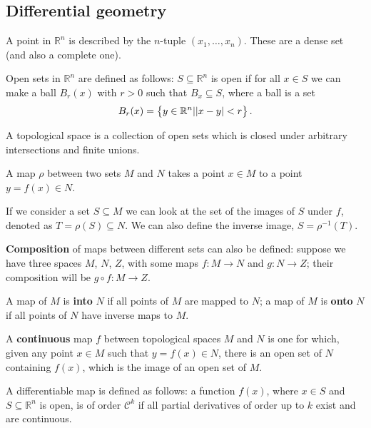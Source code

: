 \documentclass[main.tex]{subfiles}
\begin{document}
\subsection{Differential geometry}


A point in \(\mathbb{R}^{n}\) is described by the \(n\)-tuple \((x_1, \dots, x_n)\). 
These are a dense set (and also a complete one).

Open sets in \(\mathbb{R}^{n}\) are defined as follows: \(S \subseteq \mathbb{R}^{n}\) is open if for all \(x \in S\) we can make a ball \(B_r(x)\) with \(r > 0\) such that \(B_x \subseteq S\), where a ball is a set 
%
\begin{align}
B_r (x) = \qty{y \in \mathbb{R}^{n} | \abs{x - y} < r}
\,.
\end{align}

A topological space is a collection of open sets which is closed under arbitrary intersections and finite unions. 

A map \(\rho \) between two sets \(M\) and \(N\) takes a point \(x \in M\) to a point \(y = f(x) \in N\). 

If we consider a set \(S \subseteq M\) we can look at the set of the images of \(S\) under \(f\), denoted as \(T = \rho (S) \subseteq N\). 
We can also define the inverse image, \(S = \rho^{-1} (T)\).

\textbf{Composition} of maps between different sets can also be defined: suppose we have three spaces \(M\), \(N\), \(Z\), with some maps \(f \colon M \to N\) and \(g \colon N \to Z\); their composition will be \(g \circ f \colon M \to Z\). 

A map of \(M\) is \textbf{into} \(N\) if all points of \(M\) are mapped to \(N\); a map of \(M\) is \textbf{onto} \(N\) if all points of \(N\) have inverse maps to \(M\). 

A \textbf{continuous} map \(f\) between topological spaces \(M\) and \(N\) is one for which, given any point \(x \in M\) such that \(y = f(x) \in N\), there is an open set of \(N\) containing \(f(x)\), which is the image of an open set of \(M\). 


A differentiable map is defined as follows: a function \(f (x) \), where \(x \in S\) and \(S \subseteq \mathbb{R}^{n}\) is open, is of order \(\mathcal{C}^{k}\) if all partial derivatives of order up to \(k\) exist and are continuous. 
\end{document}
